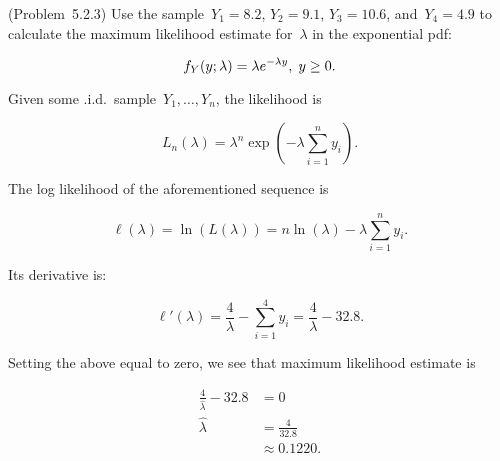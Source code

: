 \begin{problem}
  (\textnormal{Problem~5.2.3}) Use the sample~${Y_1 = 8.2}$, ${Y_2 = 9.1}$, ${Y_3 = 10.6}$, and~${Y_4 = 4.9}$ to calculate the maximum likelihood estimate for~$\lambda$ in the exponential pdf:

  \begin{equation}\label{eq:P02:Exponential}
    f_{Y}(y;\lambda) = \lambda e^{-\lambda y}, \hspace{0.1cm} y \geq 0 \text{.}
  \end{equation}
\end{problem}

Given some .i.d.\ sample~${Y_{1},\ldots,Y_{n}}$, the likelihood is

\begin{equation}\label{eq:P02:Likelihood}
  L_{n}(\lambda) = \lambda^{n}\exp\left(-\lambda\sum_{i=1}^{n} y_{i}\right)\text{.}
\end{equation}

\noindent
The log likelihood of the aforementioned sequence is

\begin{equation}\label{eq:P02:LogLikelihood}
  \ell(\lambda) = \ln\left(L(\lambda)\right) = n\ln(\lambda) - \lambda \sum_{i=1}^{n} y_i\text{.}
\end{equation}

\noindent
Its derivative is:

\begin{equation}\label{eq:P02:LogLikelihood:Derivative}
  \ell'(\lambda) = \frac{4}{\lambda} - \sum_{i=1}^{4} y_i = \frac{4}{\lambda} - 32.8  \text{.}
\end{equation}

\noindent
Setting the above equal to zero, we see that maximum likelihood estimate is

\begin{align}
  \frac{4}{\hat{\lambda}} - 32.8 &= 0 \\
  \hat{\lambda} &= \frac{4}{32.8} \\
                &\approx \boxed{0.1220} \text{.}
\end{align}
